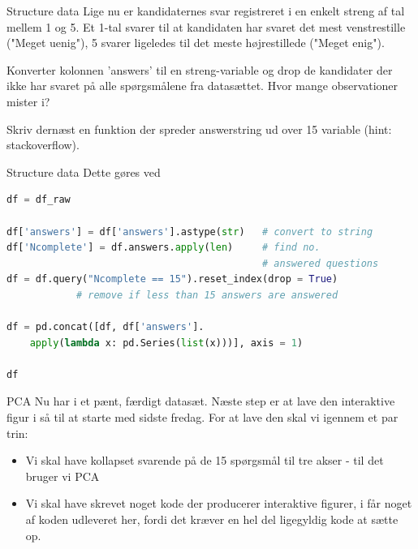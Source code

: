 \documentclass[10pt]{beamer}
\begin{document}
\begin{frame}[fragile]{Structure data}
Lige nu er kandidaternes svar registreret i en enkelt streng af tal mellem 1 og 5. Et 1-tal svarer til at kandidaten har svaret det mest venstrestille ("Meget uenig"), 5 svarer ligeledes til det meste højrestillede ("Meget enig").

Konverter kolonnen 'answers' til en streng-variable og drop de kandidater der ikke har svaret på alle spørgsmålene fra datasættet. Hvor mange observationer mister i?

Skriv dernæst en funktion der spreder answerstring ud over 15 variable (hint: stackoverflow).
\end{frame}


\begin{frame}[fragile]{Structure data}
Dette gøres ved
  \begin{lstlisting}[language=python]
df = df_raw

df['answers'] = df['answers'].astype(str)   # convert to string
df['Ncomplete'] = df.answers.apply(len)     # find no.
                                            # answered questions
df = df.query("Ncomplete == 15").reset_index(drop = True)
            # remove if less than 15 answers are answered

df = pd.concat([df, df['answers'].
    apply(lambda x: pd.Series(list(x)))], axis = 1)

df
\end{lstlisting}
\end{frame}

\begin{frame}[fragile]{PCA}
Nu har i et pænt, færdigt datasæt. Næste step er at lave den interaktive figur i så til at starte med sidste fredag. For at lave den skal vi igennem et par trin:

  \begin{itemize}
    \item  Vi skal have kollapset svarende på de 15 spørgsmål til tre akser - til det bruger vi PCA
    \item  Vi skal have skrevet noget kode der producerer interaktive figurer, i får noget af koden udleveret her, fordi det kræver en hel del ligegyldig kode at sætte op.
  \end{itemize}
\end{frame}
\end{document}
